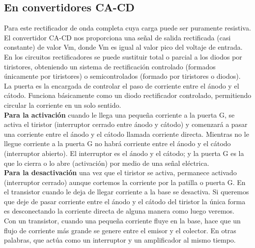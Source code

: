 \documentclass[11pt,a4paper]{article}
\begin{document}
\subsection{En convertidores CA-CD}

Para este rectificador de onda completa cuya carga puede ser puramente resistiva. El convertidor CA-CD nos proporciona una señal de salida rectificada (casi constante) de valor Vm, donde Vm es igual al valor pico del voltaje de entrada.\\
En los circuitos rectificadores se puede sustituir total o parcial a los diodos por tiristores, obteniendo un sistema de rectificación controlado (formados únicamente por tiristores) o semicontrolados (formado por tiristores o diodos).\\
La puerta es la encargada de controlar el paso de corriente entre el ánodo y el cátodo. Funciona básicamente como un diodo rectificador controlado, permitiendo circular la corriente en un solo sentido.\\
\textbf{Para la activación} cuando le llega una pequeña corriente a la puerta G, se activa el tiristor (interruptor cerrado entre ánodo y cátodo) y comenzará a pasar una corriente entre el ánodo y el cátodo llamada corriente directa. Mientras no le llegue corriente a la puerta G no habrá corriente entre el ánodo y el cátodo (interruptor abierto). El interruptor es el ánodo y el cátodo; y la puerta G es la que lo cierra o lo abre (activación) por medio de una señal eléctrica.\\

\textbf{Para la desactivación} una vez que el tiristor se activa, permanece activado (interruptor cerrado) aunque cortemos la corriente por la patilla o puerta G. En el transistor cuando le deja de llegar corriente a la base se desactiva. Si queremos que deje de pasar corriente entre el ánodo y el cátodo del tiristor la única forma es desconectando la corriente directa de alguna manera como luego veremos.\\

Con un transistor, cuando una pequeña corriente fluye en la base, hace que un flujo de corriente más grande se genere entre el emisor y el colector. En otras palabras, que actúa como un interruptor y un amplificador al mismo tiempo.
\end{document}
